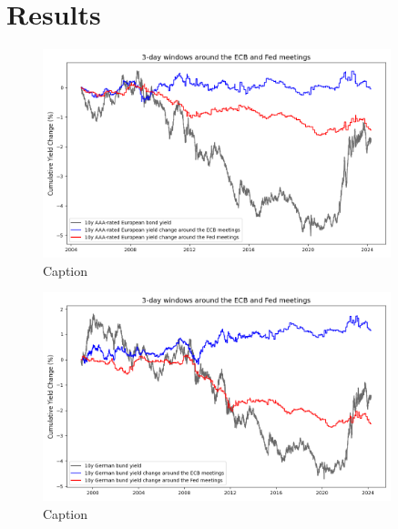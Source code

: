 \section{Results}



\newpage

\begin{figure}[!htbp]
    \centering
    \includegraphics[width=0.9\textwidth]{figures/european_bonds_1999_figure1a.png}
    \caption{Caption}
    \label{fig:enter-label}
\end{figure}

\begin{figure}[!htbp]
    \centering
    \includegraphics[width=0.9\textwidth]{figures/german_bunds_figure1a.png}
    \caption{Caption}
    \label{fig:enter-label}
\end{figure}